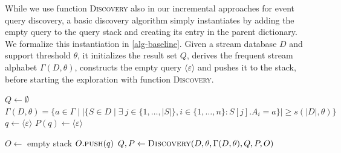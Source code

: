 While we use function \textsc{Discovery} also in our incremental approaches
for event query discovery, a basic discovery algorithm simply instantiates
by adding the empty query to the query stack and creating its entry in the
parent dictionary. We formalize this instantiation in
\autoref{alg-baseline}. Given a stream database $D$ and support threshold
$\theta$, it initializes the result set $Q$, derives the frequent stream
alphabet $\Gamma(D,\theta)$, constructs the empty query
$\langle\varepsilon\rangle$ and pushes it to the stack, before starting the
exploration with function \textsc{Discovery}.

\begin{algorithm}[H]
	\small
	\caption{\textsc{Basic Discovery Algorithm} }
	\label{alg-baseline}
	\BlankLine
	$\mathit{Q \leftarrow \emptyset}$\;
	$\Gamma(D,\theta) = \{a \in
	\Gamma \mid |\{S \in D \mid \exists \ j\in\{1,\dots,|S|\},
	i\in\{1,\dots,n\}: S[j].A_i = a\}| \geq s(|D|,\theta)\}$\;
	$q \gets\langle\varepsilon\rangle$\;
	$P(q) \gets
	\langle\varepsilon\rangle$\;

	${O \leftarrow}$ empty stack\;
	$O.\textsc{push}(q)$\;
	$ Q,P \leftarrow \textsc{Discovery}(D, \theta, \Gamma(D,\theta), Q, P,
	O)$\;
	{}
\end{algorithm}

